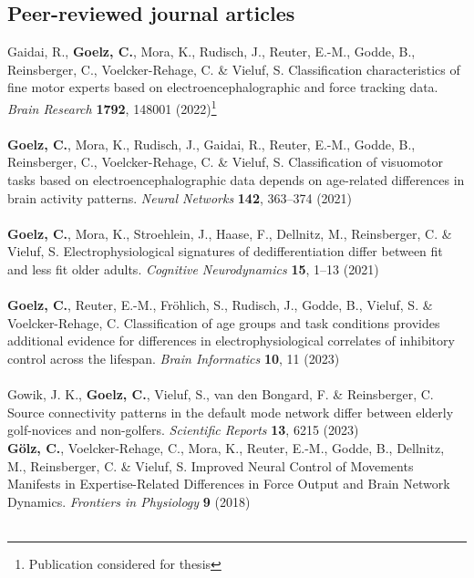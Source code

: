 \subsection*{Peer-reviewed journal articles}
Gaidai, R., \textbf{Goelz, C.}, Mora, K., Rudisch, J., Reuter, E.-M., Godde, B., Reinsberger, C., Voelcker-Rehage, C. \& Vieluf, S. Classification characteristics of fine motor experts based on electroencephalographic and force tracking data. \textit{Brain Research} \textbf{1792}, 148001 (2022)\setcounter{footnote}{0}\footnote{Publication considered for thesis}\\
\\
\textbf{Goelz, C.}, Mora, K., Rudisch, J., Gaidai, R., Reuter, E.-M., Godde, B., Reinsberger, C., Voelcker-Rehage, C. \& Vieluf, S. Classification of visuomotor tasks based on electroencephalographic data depends on age-related differences in brain activity patterns. \textit{Neural Networks} \textbf{142}, 363--374 (2021)\footnotemark[1]\\
\\
\textbf{Goelz, C.}, Mora, K., Stroehlein, J., Haase, F., Dellnitz, M., Reinsberger, C. \& Vieluf, S. Electrophysiological signatures of dedifferentiation differ between fit and less fit older adults. \textit{Cognitive Neurodynamics} \textbf{15}, 1--13 (2021)\footnotemark[1]\\
\\
\textbf{Goelz, C.}, Reuter, E.-M., Fröhlich, S., Rudisch, J., Godde, B., Vieluf, S. \& Voelcker-Rehage, C. Classification of age groups and task conditions provides additional evidence for differences in electrophysiological correlates of inhibitory control across the lifespan. \textit{Brain Informatics} \textbf{10}, 11 (2023)\footnotemark[1]\\
\\
Gowik, J. K., \textbf{Goelz, C.}, Vieluf, S., van den Bongard, F. \& Reinsberger, C. Source connectivity patterns in the default mode network differ between elderly golf-novices and non-golfers. \textit{Scientific Reports} \textbf{13}, 6215 (2023)\\
\newpage
\noindent\textbf{Gölz, C.}, Voelcker-Rehage, C., Mora, K., Reuter, E.-M., Godde, B., Dellnitz, M., Reinsberger, C. \& Vieluf, S. Improved Neural Control of Movements Manifests in Expertise-Related Differences in Force Output and Brain Network Dynamics. \textit{Frontiers in Physiology} \textbf{9} (2018)\\
\\
